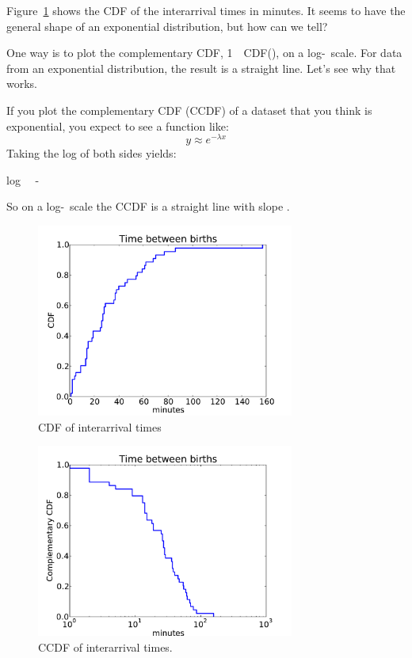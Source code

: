 \documentclass[12pt]{book}
\begin{document}
Figure~\ref{interarrival_cdf} shows the CDF of the interarrival times
in minutes.  It seems to have the general shape of an exponential
distribution, but how can we tell?

One way is to plot the complementary CDF, 1~\minus~CDF(\x), on a
log-\y~scale.  For data from an exponential distribution, the result
is a straight line.  Let's see why that works.

If you plot the complementary CDF (CCDF) of a dataset that you think is
exponential, you expect to see a function like:
%
\[ y \approx e^{-\lambda x} \]
%
Taking the log of both sides yields:

\quad log \y~\myapprox~-\mylambda \x

So on a log-\y~scale the CCDF is a straight line
with slope \minus\mylambda.


\begin{figure}
\centerline{\includegraphics[height=2.5in]{figs/interarrivals.pdf}}
\caption{CDF of interarrival times}
\label{interarrival_cdf}
\end{figure}

\begin{figure}
\centerline{\includegraphics[height=2.5in]{figs/interarrivals_logy.pdf}}
\caption{CCDF of interarrival times.}
\label{interarrival_ccdf}
\end{figure}
\end{document}
